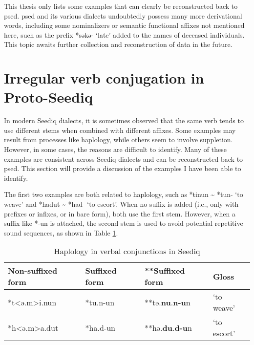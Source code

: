 
This thesis only lists some examples that can clearly be reconstructed back to \acl{psed}. \acl{psed} and its various dialects undoubtedly possess many more derivational words, including some nominalizers or semantic functional affixes not mentioned here, such as the prefix *səkə- `late' added to the names of deceased individuals. This topic awaits further collection and reconstruction of data in the future.

\section{Irregular verb conjugation in Proto-Seediq} \label{sec:psed_irr_v}

In modern Seediq dialects, it is sometimes observed that the same verb tends to use different stems when combined with different affixes. Some examples may result from processes like haplology, while others seem to involve suppletion. However, in some cases, the reasons are difficult to identify. Many of these examples are consistent across Seediq dialects and can be reconstructed back to \acl{psed}. This section will provide a discussion of the examples I have been able to identify.

The first two examples are both related to haplology, such as *tinun \~{} *tun- `to weave' and *hadut \~{} *had- `to escort'. When no suffix is added (i.e., only with prefixes or infixes, or in bare form), both use the first stem. However, when a suffix like *-un is attached, the second stem is used to avoid potential repetitive sound sequences, as shown in Table \ref{tab:psed_hap}.

\begin{table}[!htbp]
\centering
\caption{Haplology in verbal conjunctions in Seediq}
\label{tab:psed_hap}
\begin{tabular}{llll}
\hline
Non-suffixed form & Suffixed form & **Suffixed form & Gloss       \\ \hline
*t<ə.m>i.nun        & *tu.n-un       & **tə.\textbf{nu}.\textbf{n-u}n      & `to weave'  \\
*h<ə.m>a.dut        & *ha.d-un       & **hə.\textbf{du}.\textbf{d-u}n      & `to escort' \\ \hline
\end{tabular}
\end{table}

